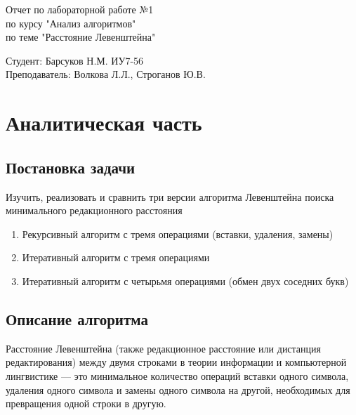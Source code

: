 \documentclass[a4paper, 14pt]{article}
\begin{document}
	\begin{titlepage}
		\begin{center}
			\begin{LARGE}
				Отчет по лабораторной работе №1\\
				по курсу "Анализ алгоритмов"\\
				по теме "Расстояние Левенштейна"
			\end{LARGE}
			
			\begin{Large}
				\vspace{10cm}
				Студент: Барсуков Н.М. ИУ7-56\\
				Преподаватель: Волкова Л.Л.,
				Строганов Ю.В.
			\end{Large}
		\end{center}
	\end{titlepage}

	\tableofcontents
	
	\newpage	
	\section{Аналитическая часть}
	
	\subsection{Постановка задачи}
	
	Изучить, реализовать и сравнить три версии алгоритма Левенштейна поиска минимального редакционного расстояния
	
	\begin{enumerate}
		\item Рекурсивный алгоритм с тремя операциями (вставки, удаления, замены)
		\item Итеративный алгоритм с тремя операциями
		\item Итеративный алгоритм с четырьмя операциями (обмен двух соседних букв)
	\end{enumerate}

	\subsection{Описание алгоритма}
	
	Расстояние Левенштейна (также редакционное расстояние или дистанция редактирования) между двумя строками в теории информации и компьютерной лингвистике — это минимальное количество операций вставки одного символа, удаления одного символа и замены одного символа на другой, необходимых для превращения одной строки в другую.\\
	
\end{document}
